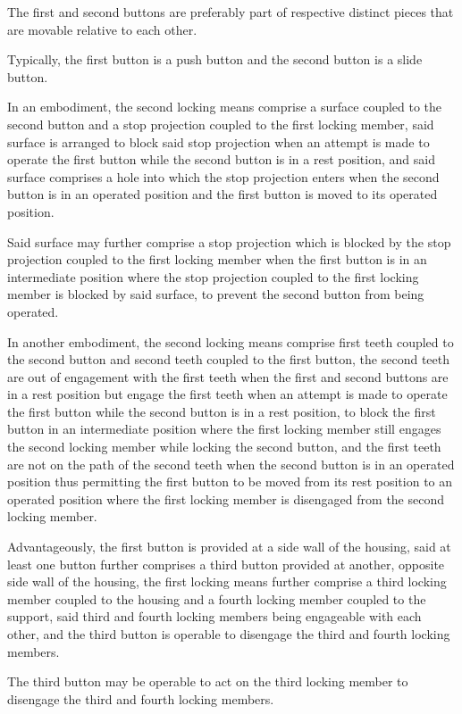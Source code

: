 \documentclass[11pt,a4paper]{article}
\begin{document}
The first and second buttons are preferably part of respective distinct pieces that are movable relative to each other.

Typically, the first button is a push button and the second button is a slide button.

In an embodiment, the second locking means comprise a surface coupled to the second button and a stop projection coupled to the first locking member, said surface is arranged to block said stop projection when an attempt is made to operate the first button while the second button is in a rest position, and said surface comprises a hole into which the stop projection enters when the second button is in an operated position and the first button is moved to its operated position.

Said surface may further comprise a stop projection which is blocked by the stop projection coupled to the first locking member when the first button is in an intermediate position where the stop projection coupled to the first locking member is blocked by said surface, to prevent the second button from being operated.

In another embodiment, the second locking means comprise first teeth coupled to the second button and second teeth coupled to the first button, the second teeth are out of engagement with the first teeth when the first and second buttons are in a rest position but engage the first teeth when an attempt is made to operate the first button while the second button is in a rest position, to block the first button in an intermediate position where the first locking member still engages the second locking member while locking the second button, and the first teeth are not on the path of the second teeth when the second button is in an operated position thus permitting the first button to be moved from its rest position to an operated position where the first locking member is disengaged from the second locking member.

Advantageously, the first button is provided at a side wall of the housing, said at least one button further comprises a third button provided at another, opposite side wall of the housing, the first locking means further comprise a third locking member coupled to the housing and a fourth locking member coupled to the support, said third and fourth locking members being engageable with each other, and the third button is operable to disengage the third and fourth locking members.

The third button may be operable to act on the third locking member to disengage the third and fourth locking members.
\end{document}
